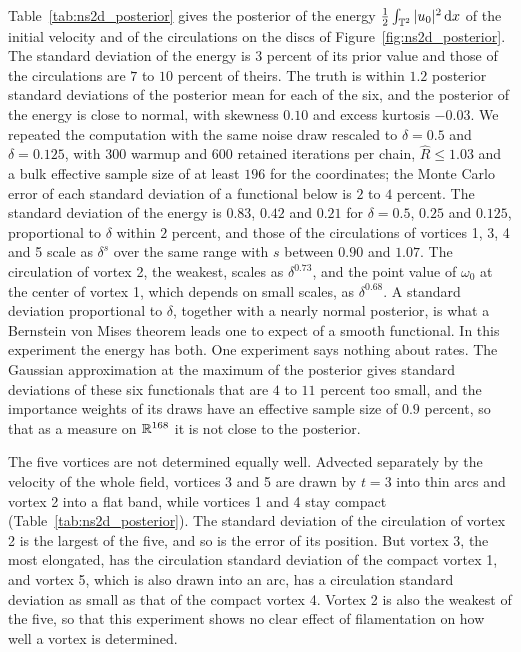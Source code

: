 Table~\ref{tab:ns2d_posterior} gives the posterior of the energy $\frac12\int_{\mathbb{T}^2}|u_0|^2\,\mathrm{d} x$ of the initial velocity and of the circulations on the discs of Figure~\ref{fig:ns2d_posterior}. The standard deviation of the energy is $3$ percent of its prior value and those of the circulations are $7$ to $10$ percent of theirs. The truth is within $1.2$ posterior standard deviations of the posterior mean for each of the six, and the posterior of the energy is close to normal, with skewness $0.10$ and excess kurtosis $-0.03$. We repeated the computation with the same noise draw rescaled to $\delta=0.5$ and $\delta=0.125$, with $300$ warmup and $600$ retained iterations per chain, $\widehat R\le1.03$ and a bulk effective sample size of at least $196$ for the coordinates; the Monte Carlo error of each standard deviation of a functional below is $2$ to $4$ percent. The standard deviation of the energy is $0.83$, $0.42$ and $0.21$ for $\delta=0.5$, $0.25$ and $0.125$, proportional to $\delta$ within $2$ percent, and those of the circulations of vortices 1, 3, 4 and 5 scale as $\delta^s$ over the same range with $s$ between $0.90$ and $1.07$. The circulation of vortex 2, the weakest, scales as $\delta^{0.73}$, and the point value of $\omega_0$ at the center of vortex 1, which depends on small scales, as $\delta^{0.68}$. A standard deviation proportional to $\delta$, together with a nearly normal posterior, is what a Bernstein von Mises theorem leads one to expect of a smooth functional. In this experiment the energy has both. One experiment says nothing about rates. The Gaussian approximation at the maximum of the posterior gives standard deviations of these six functionals that are $4$ to $11$ percent too small, and the importance weights of its draws have an effective sample size of $0.9$ percent, so that as a measure on $\mathbb{R}^{168}$ it is not close to the posterior.

The five vortices are not determined equally well. Advected separately by the velocity of the whole field, vortices 3 and 5 are drawn by $t=3$ into thin arcs and vortex 2 into a flat band, while vortices 1 and 4 stay compact (Table~\ref{tab:ns2d_posterior}). The standard deviation of the circulation of vortex 2 is the largest of the five, and so is the error of its position. But vortex 3, the most elongated, has the circulation standard deviation of the compact vortex 1, and vortex 5, which is also drawn into an arc, has a circulation standard deviation as small as that of the compact vortex 4. Vortex 2 is also the weakest of the five, so that this experiment shows no clear effect of filamentation on how well a vortex is determined.
